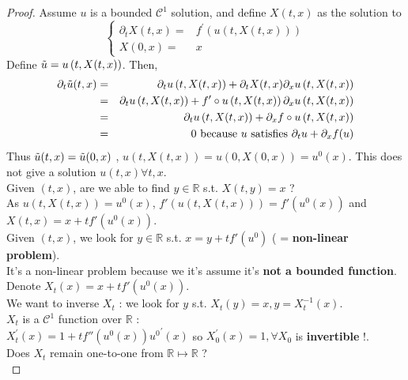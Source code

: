 \documentclass{report}
\theoremstyle{plain}
\theoremstyle{definition}
\theoremstyle{remark}
\begin{document}
\begin{proof}
    Assume $u$ is a bounded $\mathcal{C}^1$ solution, and define $X(t,x)$ as the solution to \begin{equation*}
	\left\lbrace
	\begin{array}{rl}
	\partial_t X(t,x) =& f^\prime(u(t,X(t,x)))\\
	X(0,x) =& x
	\end{array}\right.
    \end{equation*}
    Define $\Tilde{u} = u\left(t,X(t,x)\right)$.
    Then, \begin{eqnarray*}
    \partial_t \Tilde{u} (t,x) &=& \partial_t u\left(t,X(t,x)\right) + \partial_t X(t,x) \partial_x u\left(t,X(t,x)\right) \\
    &=& \partial_t u\left(t,X(t,x)\right) + f'\circ u\left(t,X(t,x)\right) \partial_x u\left(t,X(t,x)\right) \\
    &=& \partial_t u\left(t,X(t,x)\right) + \partial_x f\circ u\left(t,X(t,x)\right) \\
    &=& 0 \text{ because $u$ satisfies $\partial_t u + \partial_x f(u)$}
    \end{eqnarray*}
    Thus $\Tilde{u}(t,x) = \Tilde{u}(0,x)$ , $u\left(t,X(t,x)\right) = u\left(0,X(0,x)\right) = u^0(x) $. This does not give a solution $u(t,x) \forall t,x$.\\
    Given $(t,x)$, are we able to find $y\in\mathbb{R}$ s.t. $X(t,y) = x$ ? \\
    As $u\left(t,X(t,x)\right) = u^0(x)$, $f'\left(u\left(t,X(t,x)\right)\right) = f'\left(u^0(x)\right)$ and $X(t,x) = x + t f'\left(u^0(x)\right)$. \\
    Given $(t,x)$, we look for $y \in \mathbb{R}$ s.t. $x = y + tf'\left(u^0\right)$ ( = \textbf{non-linear problem}). \\
    It's a non-linear problem because we it's assume it's \textbf{not a bounded function}.\\
    Denote $X_t(x) = x + tf'\left(u^0(x)\right)$. \\
    We want to inverse $X_t$ : we look for $y$ s.t. $X_t(y) = x, y = X_t^{-1}(x)$. \\
    $X_t$ is a $\mathcal{C}^1$ function over $\mathbb{R}$ : \\
    $X^\prime_t(x) = 1 + tf''\left(u^0(x)\right){u^0}^\prime(x)$ so $X_0^\prime(x) = 1, \forall X_0$ is \textbf{invertible} !. \\
    Does $X_t$ remain one-to-one from $\mathbb{R} \mapsto \mathbb{R}$ ? \\

\end{proof}
\end{document}
